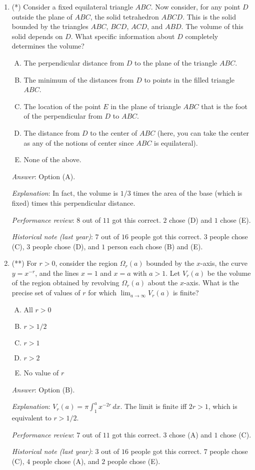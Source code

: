 \documentclass[10pt]{amsart}
\begin{document}
\begin{enumerate}
\item (*) Consider a fixed equilateral triangle $ABC$. Now consider,
  for any point $D$ outside the plane of $ABC$, the solid tetrahedron
  $ABCD$. This is the solid bounded by the triangles $ABC$, $BCD$,
  $ACD$, and $ABD$. The volume of this solid depends on $D$. What
  specific information about $D$ completely determines the volume?

  \begin{enumerate}[(A)]
  \item The perpendicular distance from $D$ to the plane of the
    triangle $ABC$.
  \item The minimum of the distances from $D$ to points in the filled
    triangle $ABC$.
  \item The location of the point $E$ in the plane of triangle $ABC$
    that is the foot of the perpendicular from $D$ to $ABC$.
  \item The distance from $D$ to the center of $ABC$ (here, you can
    take the center as any of the notions of center since $ABC$ is
    equilateral).
  \item None of the above.
  \end{enumerate}

  {\em Answer}: Option (A).

  {\em Explanation}: In fact, the volume is $1/3$ times the area of
  the base (which is fixed) times this perpendicular distance.

  {\em Performance review}: $8$ out of $11$ got this correct. $2$
  chose (D) and $1$ chose (E).

  {\em Historical note (last year)}: $7$ out of $16$ people got this
  correct. $3$ people chose (C), $3$ people chose (D), and $1$ person
  each chose (B) and (E).
\item (**) For $r > 0$, consider the region $\Omega_r(a)$ bounded by
  the $x$-axis, the curve $y = x^{-r}$, and the lines $x = 1$ and $x =
  a$ with $a > 1$. Let $V_r(a)$ be the volume of the region obtained
  by revolving $\Omega_r(a)$ about the $x$-axis. What is the precise
  set of values of $r$ for which $\lim_{a \to \infty} V_r(a)$ is
  finite?

  \begin{enumerate}[(A)]
  \item All $r > 0$
  \item $r > 1/2$
  \item $r > 1$
  \item $r > 2$
  \item No value of $r$
  \end{enumerate}

  {\em Answer}: Option (B).

  {\em Explanation}: $V_r(a) = \pi \int_1^a x^{-2r} \, dx$. The limit
  is finite iff $2r > 1$, which is equivalent to $r > 1/2$.

  {\em Performance review}: $7$ out of $11$ got this correct. $3$
  chose (A) and $1$ chose (C).

  {\em Historical note (last year)}: $3$
  out of $16$ people got this correct. $7$ people chose (C), $4$
  people chose (A), and $2$ people chose (E).

\end{enumerate}
\end{document}
